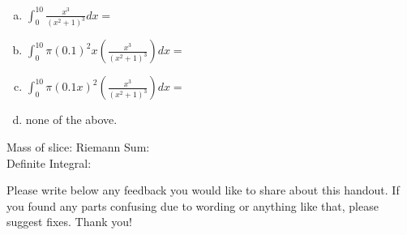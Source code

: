 \documentclass[answers]{exam}
\begin{document}
\begin{questions}
\begin{enumerate}[(a)]
	
	\item $\int_0^{10} \frac{x^3}{(x^2+1)^3} dx = $	
	
	\item $\int_0^{10} \pi(0.1)^2x\left(\frac{x^3}{(x^2+1)^3}\right) dx = $	
	
	
	\item $\int_0^{10} \pi(0.1x)^2\left(\frac{x^3}{(x^2+1)^3}\right) dx = $
	
	
	\item none of the above.
	
	
\end{enumerate}

Mass of slice: \hspace{2in} Riemann Sum:\\

Definite Integral: \\

\vspace{1in}

\question Please write below any feedback you would like to share about this handout. If you found any parts confusing due to wording or anything like that, please suggest fixes. Thank you!

\vspace{1in}

\end{questions}
\end{document}
